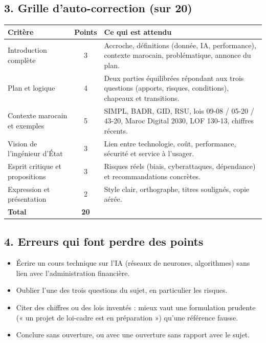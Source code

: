 \subsection*{3. Grille d'auto-correction (sur 20)}
{\small
\begin{longtable}{|p{6.2cm}|c|p{8cm}|}
\hline
\rowcolor{gray!20} \textbf{Critère} & \textbf{Points} & \textbf{Ce qui est attendu} \\ \hline
Introduction complète & 3 & Accroche, définitions (donnée, IA, performance), contexte marocain, problématique, annonce du plan. \\ \hline
Plan et logique & 4 & Deux parties équilibrées répondant aux trois questions (apports, risques, conditions), chapeaux et transitions. \\ \hline
Contexte marocain et exemples & 5 & SIMPL, BADR, GID, RSU, lois 09-08 / 05-20 / 43-20, Maroc Digital 2030, LOF 130-13, chiffres récents. \\ \hline
Vision de l'ingénieur d'État & 3 & Lien entre technologie, coût, performance, sécurité et service à l'usager. \\ \hline
Esprit critique et propositions & 3 & Risques réels (biais, cyberattaques, dépendance) et recommandations concrètes. \\ \hline
Expression et présentation & 2 & Style clair, orthographe, titres soulignés, copie aérée. \\ \hline
\textbf{Total} & \textbf{20} & \\ \hline
\end{longtable}
}

\subsection*{4. Erreurs qui font perdre des points}
\begin{itemize}
    \item Écrire un cours technique sur l'IA (réseaux de neurones, algorithmes) sans lien avec l'administration financière.
    \item Oublier l'une des trois questions du sujet, en particulier les risques.
    \item Citer des chiffres ou des lois inventés : mieux vaut une formulation prudente (« un projet de loi-cadre est en préparation ») qu'une référence fausse.
    \item Conclure sans ouverture, ou avec une ouverture sans rapport avec le sujet.
\end{itemize}
